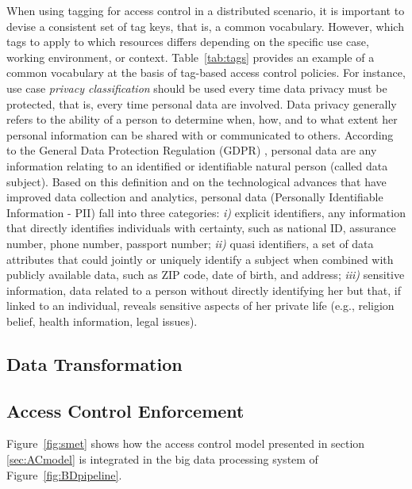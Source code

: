 When using tagging for access control in a distributed scenario, it is important to devise a consistent set of tag keys, that is, a common vocabulary. However, which tags to apply to which resources differs depending on the specific use case, working environment, or context.  Table~\ref{tab:tags} provides an example of a common vocabulary at the basis of tag-based access control policies. For instance, use case {\em privacy classification} should be used every time data privacy must be protected, that is, every time personal data are involved. Data privacy generally refers to the ability of a person to determine when, how, and to what extent her personal information can be shared with or communicated to others. According to the General Data Protection Regulation (GDPR) \cite{EUdataregulations2018}, personal data are any information relating to an identified or identifiable natural person (called data subject). Based on this definition and on the technological advances that have improved data collection and analytics, personal data (Personally Identifiable Information - PII) fall into three categories: {\em i)} explicit identifiers, any information that directly identifies individuals with certainty, such as national ID, assurance number, phone number, passport number; {\em ii)} quasi identifiers, a set of data attributes that could jointly or uniquely identify a subject when combined with publicly available data, such as ZIP code, date of birth, and address; {\em iii)} sensitive information, data related to a person without directly identifying her but that, if linked to an individual, reveals sensitive aspects of her private life (e.g., religion belief, health information, legal issues).







\subsection{Data Transformation}\label{sec:dataTransformations}




\subsection{Access Control Enforcement}
Figure~\ref{fig:smet} shows how the access control model presented in section \ref{sec:ACmodel} is integrated in the big data processing system of Figure~\ref{fig:BDpipeline}. 

